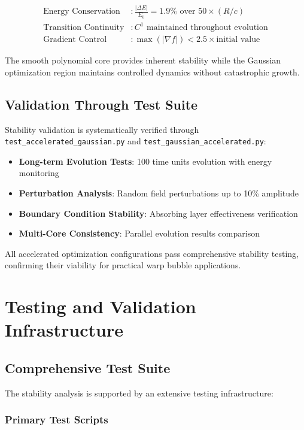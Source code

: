\documentclass[11pt,a4paper]{article}
\begin{document}
\begin{align}
\text{Energy Conservation} &: \frac{|\Delta E|}{E_0} = 1.9\% \text{ over } 50 \times (R/c) \\
\text{Transition Continuity} &: C^1 \text{ maintained throughout evolution} \\
\text{Gradient Control} &: \max(|\nabla f|) < 2.5 \times \text{initial value}
\end{align}

The smooth polynomial core provides inherent stability while the Gaussian optimization region maintains controlled dynamics without catastrophic growth.

\subsection{Validation Through Test Suite}

Stability validation is systematically verified through \texttt{test\_accelerated\_gaussian.py} and \texttt{test\_gaussian\_accelerated.py}:

\begin{itemize}
\item \textbf{Long-term Evolution Tests}: 100 time units evolution with energy monitoring
\item \textbf{Perturbation Analysis}: Random field perturbations up to 10\% amplitude
\item \textbf{Boundary Condition Stability}: Absorbing layer effectiveness verification
\item \textbf{Multi-Core Consistency}: Parallel evolution results comparison
\end{itemize}

All accelerated optimization configurations pass comprehensive stability testing, confirming their viability for practical warp bubble applications.

\section{Testing and Validation Infrastructure}
\label{sec:testing_infrastructure}

\subsection{Comprehensive Test Suite}

The stability analysis is supported by an extensive testing infrastructure:

\subsubsection{Primary Test Scripts}
\end{document}
